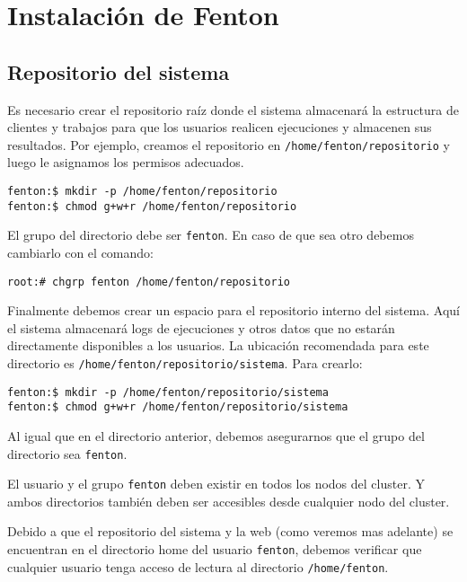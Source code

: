 \documentclass[a4paper,10pt,spanish]{article}
\begin{document}
\section{Instalaci\'{o}n de Fenton}

\subsection{Repositorio del sistema}

Es necesario crear el repositorio ra\'{i}z donde el sistema almacenar\'{a} la estructura de clientes y trabajos para que los usuarios realicen ejecuciones y almacenen sus resultados. Por ejemplo, creamos el repositorio en \mbox{\texttt{/home/fenton/repositorio}} y luego le asignamos los permisos adecuados.

\begin{verbatim}
fenton:$ mkdir -p /home/fenton/repositorio
fenton:$ chmod g+w+r /home/fenton/repositorio
\end{verbatim}

El grupo del directorio debe ser \mbox{\texttt{fenton}}. En caso de que sea otro debemos cambiarlo con el comando:

\begin{verbatim}
root:# chgrp fenton /home/fenton/repositorio
\end{verbatim}

Finalmente debemos crear un espacio para el repositorio interno del sistema. Aqu\'{i} el sistema almacenar\'{a} logs de ejecuciones y otros datos que no estar\'{a}n directamente disponibles a los usuarios. La ubicaci\'{o}n recomendada para este directorio es \mbox{\texttt{/home/fenton/repositorio/sistema}}. Para crearlo:

\begin{verbatim}
fenton:$ mkdir -p /home/fenton/repositorio/sistema
fenton:$ chmod g+w+r /home/fenton/repositorio/sistema
\end{verbatim}

Al igual que en el directorio anterior, debemos asegurarnos que el grupo del directorio sea \mbox{\texttt{fenton}}.

El usuario y el grupo \mbox{\texttt{fenton}} deben existir en todos los nodos del cluster. Y ambos directorios tambi\'{e}n deben ser accesibles desde cualquier nodo del cluster.

Debido a que el repositorio del sistema y la web (como veremos mas adelante) se encuentran en el directorio home del usuario \texttt{fenton}, debemos verificar que cualquier usuario tenga acceso de lectura al directorio \mbox{\texttt{/home/fenton}}. 
\end{document}
